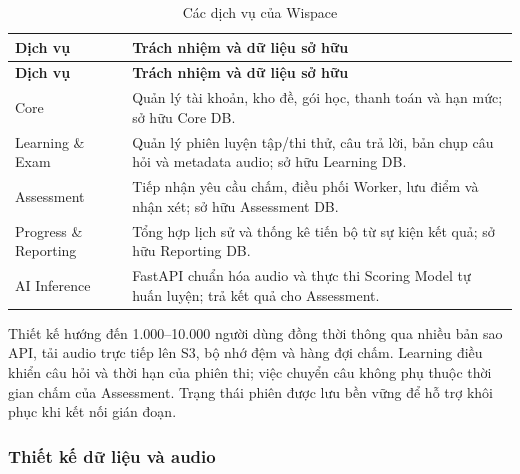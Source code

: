 \begin{longtable}{|>{\raggedright\arraybackslash}p{}|>{\raggedright\arraybackslash}p{}|}

\caption{Các dịch vụ của Wispace}\label{design:tab:1}\\\hline

\textbf{Dịch vụ} & \textbf{Trách nhiệm và dữ liệu sở hữu} \\ \hline

\endfirsthead

\hline

\textbf{Dịch vụ} & \textbf{Trách nhiệm và dữ liệu sở hữu} \\ \hline

\endhead

Core & Quản lý tài khoản, kho đề, gói học, thanh toán và hạn mức; sở hữu Core DB. \\ \hline

Learning \& Exam & Quản lý phiên luyện tập/thi thử, câu trả lời, bản chụp câu hỏi và metadata audio; sở hữu Learning DB. \\ \hline

Assessment & Tiếp nhận yêu cầu chấm, điều phối Worker, lưu điểm và nhận xét; sở hữu Assessment DB. \\ \hline

Progress \& Reporting & Tổng hợp lịch sử và thống kê tiến bộ từ sự kiện kết quả; sở hữu Reporting DB. \\ \hline

AI Inference & FastAPI chuẩn hóa audio và thực thi Scoring Model tự huấn luyện; trả kết quả cho Assessment. \\ \hline

\end{longtable}

\endgroup

Thiết kế hướng đến 1.000--10.000 người dùng đồng thời thông qua nhiều bản sao API, tải audio trực tiếp lên S3, bộ nhớ đệm và hàng đợi chấm. Learning điều khiển câu hỏi và thời hạn của phiên thi; việc chuyển câu không phụ thuộc thời gian chấm của Assessment. Trạng thái phiên được lưu bền vững để hỗ trợ khôi phục khi kết nối gián đoạn.

\subsubsection{Thiết kế dữ liệu và audio}

